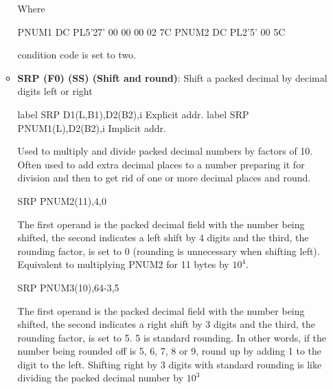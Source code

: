 \documentclass{report}
\begin{document}
\begin{itemize}
\begin{itemize}
                    Where
                    \bigbreak \noindent 
                    \begin{cppcode}
                        PNUM1 DC PL5'27'     00 00 00 02 7C
                        PNUM2 DC PL2'5'      00 5C
                    \end{cppcode}
                    \bigbreak \noindent 
                    condition code is set to two.
                \item \textbf{SRP (F0) (SS) (Shift and round)}: Shift a packed decimal by decimal digits left or right
                    \bigbreak \noindent 
                    \begin{cppcode}
                        label SRP D1(L,B1),D2(B2),i Explicit addr.
                        label SRP PNUM1(L),D2(B2),i Implicit addr.
                    \end{cppcode}
                    \bigbreak \noindent 
                    Used to multiply and divide packed decimal numbers by factors of 10.
                    \bigbreak \noindent 
                    Often used to add extra decimal places to a number preparing it for division and then to get rid of one or more decimal places and round.
                    \bigbreak \noindent 
                    \begin{cppcode}
                    SRP PNUM2(11),4,0 
                    \end{cppcode}
                    \bigbreak \noindent 
                    The first operand is the packed decimal field with the number being shifted, the second indicates a left shift by 4 digits and the third, the rounding factor, is set to 0 (rounding is unnecessary when shifting left).
                    \bigbreak \noindent 
                    Equivalent to multiplying PNUM2 for 11 bytes by $10^{4}$.
                    \bigbreak \noindent 
                    \begin{cppcode}
                    SRP PNUM3(10),64-3,5
                    \end{cppcode}
                    \bigbreak \noindent 
                    The first operand is the packed decimal field with the number being shifted, the second indicates a right shift by 3 digits and the third, the rounding factor, is set to 5. 5 is standard rounding. In other words, if the number being rounded off is 5, 6, 7, 8 or 9, round up by adding 1 to the digit to the left.
                    \bigbreak \noindent 
                    Shifting right by 3 digits with standard rounding is like dividing the packed decimal number by $10^{3}$

\end{itemize}
\end{itemize}
\end{document}
